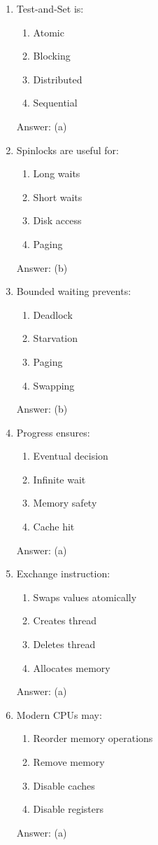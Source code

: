 \begin{enumerate}
\item Test-and-Set is:
\begin{enumerate}[label=(\alph*)]
\item Atomic
\item Blocking
\item Distributed
\item Sequential
\end{enumerate}
Answer: (a)

\item Spinlocks are useful for:
\begin{enumerate}[label=(\alph*)]
\item Long waits
\item Short waits
\item Disk access
\item Paging
\end{enumerate}
Answer: (b)

\item Bounded waiting prevents:
\begin{enumerate}[label=(\alph*)]
\item Deadlock
\item Starvation
\item Paging
\item Swapping
\end{enumerate}
Answer: (b)

\item Progress ensures:
\begin{enumerate}[label=(\alph*)]
\item Eventual decision
\item Infinite wait
\item Memory safety
\item Cache hit
\end{enumerate}
Answer: (a)

\item Exchange instruction:
\begin{enumerate}[label=(\alph*)]
\item Swaps values atomically
\item Creates thread
\item Deletes thread
\item Allocates memory
\end{enumerate}
Answer: (a)

\item Modern CPUs may:
\begin{enumerate}[label=(\alph*)]
\item Reorder memory operations
\item Remove memory
\item Disable caches
\item Disable registers
\end{enumerate}
Answer: (a)


\end{enumerate}
